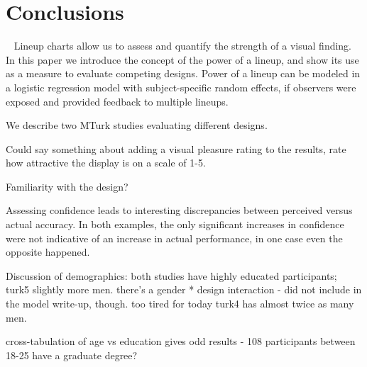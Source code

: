 \section{Conclusions}~\label{conclusions}
Lineup charts allow us to assess and quantify the strength of a visual finding. In this paper we introduce the concept of  the power of a lineup, and show its use as a measure to evaluate competing designs. 
Power of a lineup can be modeled in a logistic regression model with subject-specific random effects, if observers were exposed and provided feedback to multiple lineups. 

We describe two MTurk studies evaluating different designs.


Could say something about adding a visual pleasure rating to the results, rate how attractive the display is on a scale of 1-5.

Familiarity with the design?

Assessing confidence leads to interesting discrepancies between perceived versus actual accuracy. In both examples, the only significant increases in confidence were not indicative of an increase in actual performance, in one case even the opposite happened. 

Discussion of demographics: both studies have highly educated participants; turk5 slightly more men. there's a gender * design interaction - did not include in the model write-up, though. too tired for today
turk4 has almost twice as many men.

cross-tabulation of age vs education gives odd results - 108 participants between 18-25 have a graduate degree?

